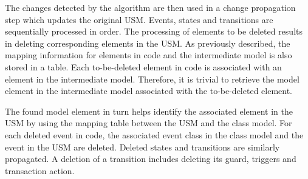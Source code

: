 The changes detected by the algorithm are then used in a change propagation step which updates the original USM. Events, states and transitions are sequentially processed in order. The processing of elements to be deleted results in deleting corresponding elements in the USM. As previously described, the mapping information for elements in code and the intermediate model is also stored in a table. Each to-be-deleted element in code is associated with an element in the intermediate model. Therefore, it is trivial to retrieve the model element in the intermediate model associated with the to-be-deleted element.

The found model element in turn helps identify the associated element in the USM by using the mapping table between the USM and the class model. For each deleted event in code, the associated event class in the class model and the event in the USM are deleted. Deleted states and transitions are similarly propagated. A deletion of a transition includes deleting its guard, triggers and transaction action. 

